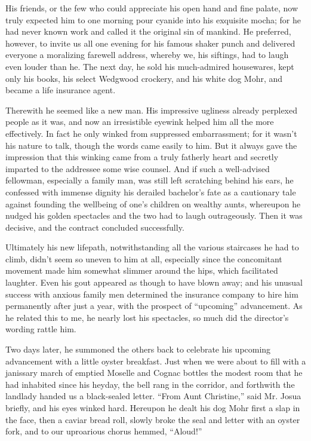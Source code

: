 \documentclass[12pt,a4paper]{article}
\begin{document}
His friends, or the few who could appreciate his open hand and fine palate, now truly expected him to one morning pour cyanide into his exquisite mocha; for he had never known work and called it the original sin of mankind. He preferred, however, to invite us all one evening for his famous shaker punch and delivered everyone a moralizing farewell address, whereby we, his siftings, had to laugh even louder than he. The next day, he sold his much-admired housewares, kept only his books, his select Wedgwood crockery, and his white dog Mohr, and became a life insurance agent.

Therewith he seemed like a new man. His impressive ugliness already perplexed people as it was, and now an irresistible eyewink helped him all the more effectively. In fact he only winked from suppressed embarrassment; for it wasn’t his nature to talk, though the words came easily to him. But it always gave the impression that this winking came from a truly fatherly heart and secretly imparted to the addressee some wise counsel. And if such a well-advised fellowman, especially a family man, was still left scratching behind his ears, he confessed with immense dignity his derailed bachelor’s fate as a cautionary tale against founding the wellbeing of one’s children on wealthy aunts, whereupon he nudged his golden spectacles and the two had to laugh outrageously. Then it was decisive, and the contract concluded successfully.

Ultimately his new lifepath, notwithstanding all the various staircases he had to climb, didn’t seem so uneven to him at all, especially since the concomitant movement made him somewhat slimmer around the hips, which facilitated laughter. Even his gout appeared as though to have blown away; and his unusual success with anxious family men determined the insurance company to hire him permanently after just a year, with the prospect of “upcoming” advancement. As he related this to me, he nearly lost his spectacles, so much did the director’s wording rattle him.

Two days later, he summoned the others back to celebrate his upcoming advancement with a little oyster breakfast. Just when we were about to fill with a janissary march of emptied Moselle and Cognac bottles the modest room that he had inhabited since his heyday, the bell rang in the corridor, and forthwith the landlady handed us a black-sealed letter. “From Aunt Christine,” said Mr. Josua briefly, and his eyes winked hard. Hereupon he dealt his dog Mohr first a slap in the face, then a caviar bread roll, slowly broke the seal and letter with an oyster fork, and to our uproarious chorus hemmed, “Aloud!”
\end{document}
